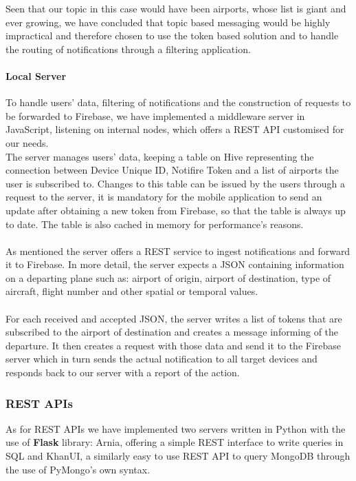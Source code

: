 Seen that our topic in this case would have been airports, whose list is giant and ever growing, we have concluded that topic based messaging would be highly impractical and therefore chosen to use the token based solution and to handle the routing of notifications through a filtering application.

\paragraph{Local Server}
To handle users' data, filtering of notifications and the construction of requests to be forwarded to Firebase, we have implemented a middleware server in JavaScript, listening on internal nodes, which offers a REST API customised for our needs.
\\
The server manages users' data, keeping a table on Hive representing the connection between Device Unique ID, Notifire Token and a list of airports the user is subscribed to. Changes to this table can be issued by the users through a request to the server, it is mandatory for the mobile application to send an update after obtaining a new token from Firebase, so that the table is always up to date.
The table is also cached in memory for performance's reasons.
\\ \\
As mentioned the server offers a REST service to ingest notifications and forward it to Firebase. In more detail, the server expects a JSON containing information on a departing plane such as: airport of origin, airport of destination, type of aircraft, flight number and other spatial or temporal values.
\\ \\
For each received and accepted JSON, the server writes a list of tokens that are subscribed to the airport of destination and creates a message informing of the departure. It then creates a request with those data and send it to the Firebase server which in turn sends the actual notification to all target devices and responds back to our server with a report of the action.

\subsubsection{REST APIs}
As for REST APIs we have implemented two servers written in Python with the use of \textbf{Flask} library: Arnia, offering a simple REST interface to write queries in SQL and KhanUI, a similarly easy to use REST API to query MongoDB through the use of PyMongo's own syntax.


